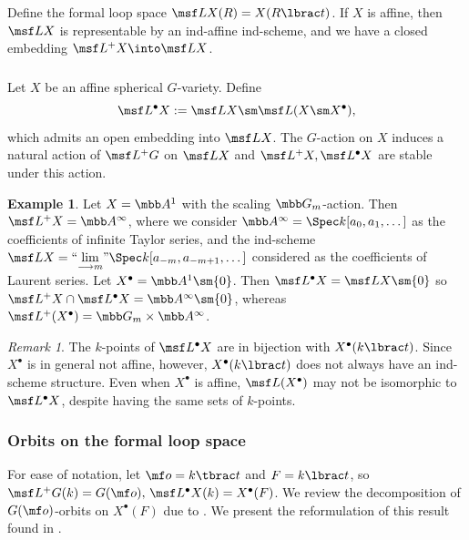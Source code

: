 \documentclass[final]{amsart}
\theoremstyle{remark}
\newtheorem{rem}[subsubsection]{Remark}
\theoremstyle{definition}
\newtheorem{eg}[subsubsection]{Example}
\numberwithin{equation}{section}
\begin{document}
Define the formal loop space 
$\msf L X(R) = X(R\lbrac t)$. 
If $X$ is affine, then $\msf L X$ is representable by an ind-affine ind-scheme,
and we have a closed embedding $\msf L^+ X \into \msf L X$.

\subsubsection{}
Let $X$ be an affine spherical $G$-variety.
Define 
\[ \msf L^\bullet X := \msf L X \sm \msf L(X\sm X^\bullet), \]
which admits an open embedding into $\msf L X$. 
The $G$-action on $X$ induces a natural action of $\msf L^+ G$ on 
$\msf L X$ and $\msf L^+X, \msf L^\bullet X$ are stable under this action. 


\begin{eg} \label{eg:A1}
Let $X = \mbb A^1$ with the scaling $\mbb G_m$-action. Then  
$\msf L^+ X = \mbb A^\infty$, where we consider $\mbb A^\infty = \Spec k[a_0,a_1,\dotsc]$
as the coefficients of infinite Taylor series, and the ind-scheme
$\msf L X = ``\underset{\longrightarrow m}\lim" \Spec k[a_{-m},a_{-m+1},\dotsc]$ considered
as the coefficients of Laurent series.
Let $X^\bullet = \mbb A^1 \sm \{0\}$. Then $\msf L^\bullet X = \msf L X \sm \{0\}$ so $\msf L^+ X \cap \msf L^\bullet X = \mbb A^\infty \sm \{0\}$, whereas $\msf L^+(X^\bullet) = \mbb G_m \times \mbb A^\infty$. 
\end{eg}

\begin{rem} 
The $k$-points of $\msf L^\bullet X$ are in bijection with $X^\bullet(k\lbrac t)$. 
Since $X^\bullet$ is in general not affine, however, $X^\bullet(k\lbrac t)$ does not
always have an ind-scheme structure. Even when $X^\bullet$ is affine, 
$\msf L(X^\bullet)$ may not be isomorphic to $\msf L^\bullet X$, despite having the same sets of $k$-points. 
\end{rem}


\subsubsection{Orbits on the formal loop space} \label{sect:stratLXpoint}

For ease of notation, 
let $\mf o = k\tbrac t$ and $F = k\lbrac t$, so 
$\msf L^+G(k) = G(\mf o),\, \msf L^\bullet X(k) = X^\bullet(F)$.
We review the decomposition of $G(\mf o)$-orbits on $X^\bullet(F)$ due to \cite{LV}.
We present the reformulation of this result found in \cite[Theorem 3.3.1]{GN}. 

\smallskip
\end{document}
